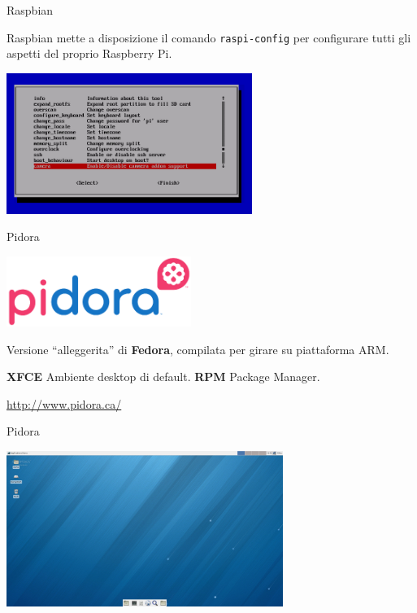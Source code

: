 \documentclass[xcolor=svgnames,11pt]{beamer}
\begin{document}
\begin{frame}{Raspbian}

Raspbian mette a disposizione il comando \texttt{raspi-config} per configurare tutti gli aspetti del proprio Raspberry Pi.

\begin{center}
\includegraphics[width=8cm]{raspi-config.png}
\end{center}

\end{frame}

\begin{frame}{Pidora}
\begin{center}
\includegraphics[width=6cm]{pidora.png}
\end{center}

\medskip
\pause

Versione ``alleggerita'' di \textbf{Fedora}, compilata per girare su piattaforma ARM.

\medskip
\pause

\textbf{XFCE} Ambiente desktop di default. \textbf{RPM} Package Manager.

\pause
\medskip
\begin{center}
\url{http://www.pidora.ca/}
\end{center}
\end{frame}

\begin{frame}{Pidora}
\begin{center}
\includegraphics[width=9cm]{pidora-desktop.jpg}
\end{center}
\end{frame}
\end{document}
